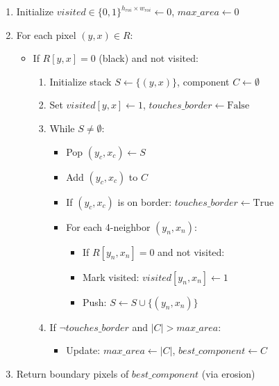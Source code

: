 \documentclass[9pt,a4paper,twocolumn,twoside]{tau-class/tau}
\begin{document}
    \begin{enumerate}
        \item Initialize $visited \in \{0, 1\}^{h_{roi} \times w_{roi}} \leftarrow 0$, $max\_area \leftarrow 0$
        \item For each pixel $(y, x) \in R$:
        \begin{itemize}
            \item If $R[y, x] = 0$ (black) and not visited:
            \begin{enumerate}
                \item Initialize stack $S \leftarrow \{(y, x)\}$, component $C \leftarrow \emptyset$
                \item Set $visited[y, x] \leftarrow 1$, $touches\_border \leftarrow \text{False}$
                \item While $S \neq \emptyset$:
                \begin{itemize}
                    \item Pop $(y_c, x_c) \leftarrow S$
                    \item Add $(y_c, x_c)$ to $C$
                    \item If $(y_c, x_c)$ is on border: $touches\_border \leftarrow \text{True}$
                    \item For each 4-neighbor $(y_n, x_n)$:
                    \begin{itemize}
                        \item If $R[y_n, x_n] = 0$ and not visited:
                        \item Mark visited: $visited[y_n, x_n] \leftarrow 1$
                        \item Push: $S \leftarrow S \cup \{(y_n, x_n)\}$
                    \end{itemize}
                \end{itemize}
                \item If $\neg touches\_border$ and $|C| > max\_area$:
                \begin{itemize}
                    \item Update: $max\_area \leftarrow |C|$, $best\_component \leftarrow C$
                \end{itemize}
            \end{enumerate}
        \end{itemize}
        \item Return boundary pixels of $best\_component$ (via erosion)
    \end{enumerate}
\end{document}
